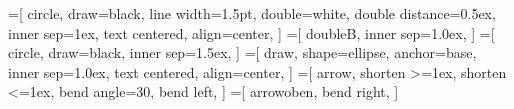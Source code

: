 %
%
%
%
%
%
=[%
	circle,%
	draw=black,%
	line width=1.5pt,%
	double=white,%
	double distance=0.5ex,%
	inner sep=1ex,%
	text centered,%
	align=center,%
]%
=[%
	doubleB,%
	inner sep=1.0ex,%
]%
=[%
	circle,%
	draw=black,%
	inner sep=1.5ex,%
]%
=[%
	draw,%
	shape=ellipse,%
	anchor=base,%
	inner sep=1.0ex,%
	text centered,%
	align=center,%
]%
%
%
=[%
	arrow,%
	shorten >=1ex,%
	shorten <=1ex,%
	bend angle=30,%
	bend left,%
]%
=[%
	arrowoben,%
	bend right,%
]%
%
%